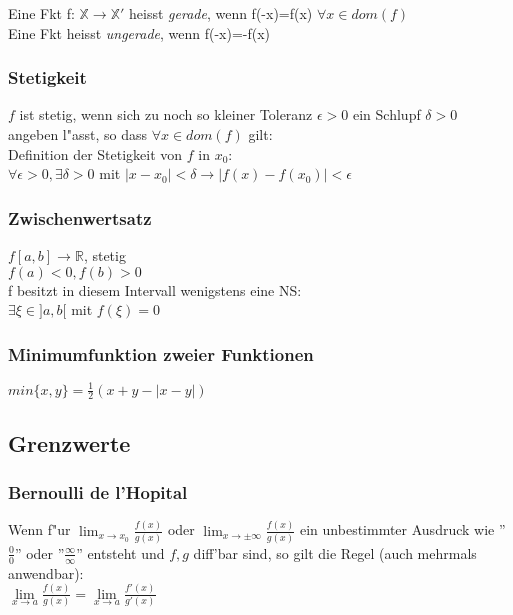 \documentclass[10pt, a4paper, twocolumn]{scrartcl}
\begin{document}
Eine Fkt f: $\mathbb{X}\to\mathbb{X}'$ heisst \textit{gerade}, wenn f(-x)=f(x) $\forall x \in dom(f)$\\
Eine Fkt heisst \textit{ungerade}, wenn f(-x)=-f(x)

\subsubsection{Stetigkeit}
$f$ ist stetig, wenn sich zu noch so kleiner Toleranz $\epsilon > 0$ ein Schlupf $\delta > 0$ angeben l"asst, so dass $\forall x \in dom(f)$ gilt:\\
Definition der Stetigkeit von $f$ in $x_0$:\\
$\forall \epsilon > 0, \exists \delta > 0$ mit $\mid x - x_0 \mid < \delta \rightarrow \mid f(x)-f(x_0)\mid < \epsilon$

\subsubsection{Zwischenwertsatz}
$f[a,b]\rightarrow\mathbb{R}$, stetig\\
$f(a) < 0, f(b) > 0$\\
f besitzt in diesem Intervall wenigstens eine NS:\\
$\exists\xi\in]a,b[$ mit $f(\xi)=0$

\subsubsection{Minimumfunktion zweier Funktionen}

$min\{x,y\}=\frac{1}{2}(x+y-|x-y|)$

\subsection{Grenzwerte}

\subsubsection{Bernoulli de l'Hopital}

Wenn f"ur $\lim_{x\rightarrow x_0} \frac{f(x)}{g(x)}$ oder $\lim_{x\rightarrow \pm \infty}\frac{f(x)}{g(x)}$ ein unbestimmter Ausdruck wie ''$\frac{0}{0}$'' oder ''$\frac{\infty}{\infty}$'' entsteht und $f,g$ diff'bar sind, so gilt die Regel (auch mehrmals anwendbar):\\
$\lim\limits_{x\rightarrow a}\frac{f(x)}{g(x)}=\lim\limits_{x\rightarrow a}\frac{f'(x)}{g'(x)}$\\
\end{document}

